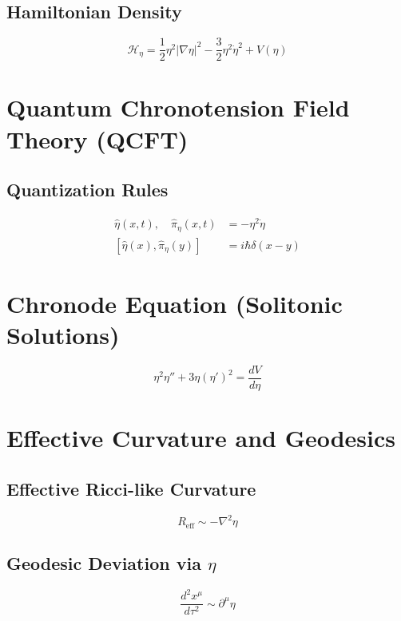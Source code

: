 \documentclass{article}
\begin{document}
\subsection{Hamiltonian Density}
\begin{equation}
\mathcal{H}_\eta = \frac{1}{2} \eta^2 |\nabla \eta|^2 - \frac{3}{2} \eta^2 \dot{\eta}^2 + V(\eta)
\end{equation}

\section{Quantum Chronotension Field Theory (QCFT)}

\subsection{Quantization Rules}
\begin{align}
\hat{\eta}(x,t), \quad \hat{\pi}_\eta(x,t) &= -\eta^2 \dot{\eta} \\
[\hat{\eta}(x), \hat{\pi}_\eta(y)] &= i\hbar \delta(x-y)
\end{align}

\section{Chronode Equation (Solitonic Solutions)}
\begin{equation}
\eta^2 \eta'' + 3\eta (\eta')^2 = \frac{dV}{d\eta}
\end{equation}

\section{Effective Curvature and Geodesics}

\subsection{Effective Ricci-like Curvature}
\begin{equation}
R_{\text{eff}} \sim -\nabla^2 \eta
\end{equation}

\subsection{Geodesic Deviation via \(\eta\)}
\begin{equation}
\frac{d^2 x^\mu}{d\tau^2} \sim \partial^\mu \eta
\end{equation}
\end{document}
